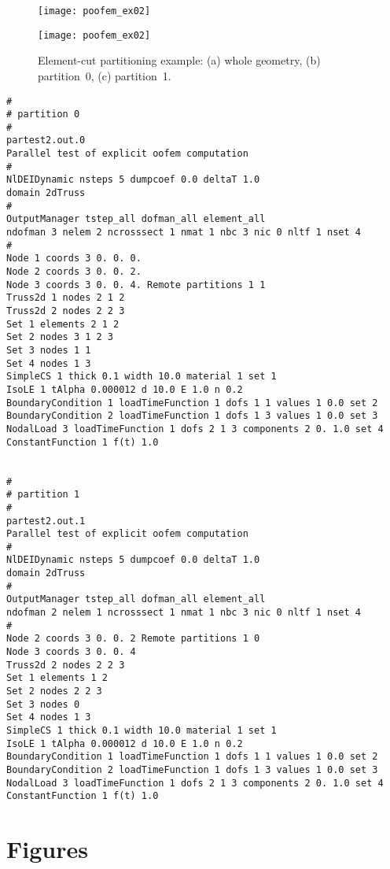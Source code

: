 \documentclass[a4paper]{article}
\begin{document}
\begin{figure}[htb]
\begin{htmlonly}
  \centerline{\texttt{[image: poofem\_ex02]}}
\end{htmlonly}
\centerline{\texttt{[image: poofem\_ex02]}}
\caption{Element-cut partitioning example: (a) whole geometry,
(b) partition~0, (c) partition~1.}
\label{elmentcut-ex02}
\end{figure}

\begin{verbatim}
#
# partition 0
#
partest2.out.0
Parallel test of explicit oofem computation
#
NlDEIDynamic nsteps 5 dumpcoef 0.0 deltaT 1.0
domain 2dTruss
#
OutputManager tstep_all dofman_all element_all
ndofman 3 nelem 2 ncrosssect 1 nmat 1 nbc 3 nic 0 nltf 1 nset 4
#
Node 1 coords 3 0. 0. 0.
Node 2 coords 3 0. 0. 2.
Node 3 coords 3 0. 0. 4. Remote partitions 1 1
Truss2d 1 nodes 2 1 2
Truss2d 2 nodes 2 2 3
Set 1 elements 2 1 2
Set 2 nodes 3 1 2 3
Set 3 nodes 1 1
Set 4 nodes 1 3
SimpleCS 1 thick 0.1 width 10.0 material 1 set 1
IsoLE 1 tAlpha 0.000012 d 10.0 E 1.0 n 0.2
BoundaryCondition 1 loadTimeFunction 1 dofs 1 1 values 1 0.0 set 2
BoundaryCondition 2 loadTimeFunction 1 dofs 1 3 values 1 0.0 set 3
NodalLoad 3 loadTimeFunction 1 dofs 2 1 3 components 2 0. 1.0 set 4
ConstantFunction 1 f(t) 1.0


#
# partition 1
#
partest2.out.1
Parallel test of explicit oofem computation
#
NlDEIDynamic nsteps 5 dumpcoef 0.0 deltaT 1.0
domain 2dTruss
#
OutputManager tstep_all dofman_all element_all
ndofman 2 nelem 1 ncrosssect 1 nmat 1 nbc 3 nic 0 nltf 1 nset 4
#
Node 2 coords 3 0. 0. 2 Remote partitions 1 0
Node 3 coords 3 0. 0. 4
Truss2d 2 nodes 2 2 3
Set 1 elements 1 2
Set 2 nodes 2 2 3
Set 3 nodes 0
Set 4 nodes 1 3
SimpleCS 1 thick 0.1 width 10.0 material 1 set 1
IsoLE 1 tAlpha 0.000012 d 10.0 E 1.0 n 0.2
BoundaryCondition 1 loadTimeFunction 1 dofs 1 1 values 1 0.0 set 2
BoundaryCondition 2 loadTimeFunction 1 dofs 1 3 values 1 0.0 set 3
NodalLoad 3 loadTimeFunction 1 dofs 2 1 3 components 2 0. 1.0 set 4
ConstantFunction 1 f(t) 1.0
\end{verbatim}

\section{Figures}
\end{document}
